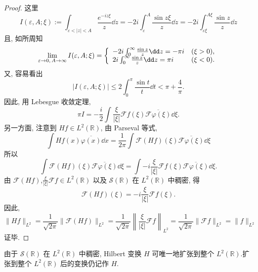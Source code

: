 \begin{proof}
这里
\begin{equation*}
I(\varepsilon, A; \xi) := \int_{\varepsilon < |z| < A}\frac{e^{-iz\xi}}{z}\dd z = -2i\int_{\varepsilon}^{A}\frac{\sin z\xi}{z}\dd z = -2i\int_{\varepsilon\xi}^{A\xi}\frac{\sin z}{z}\dd z
\end{equation*}
且, 如所周知
\begin{equation*}
\lim_{\varepsilon \to 0,\, A \to \infty} I(\varepsilon, A; \xi) = \left\{ \begin{array}{l l}
-2i\int_{0}^{\infty}\frac{\sin z}{z}\dd z = -\pi i & (\xi > 0),\\
2i\int_{0}^{\infty}\frac{\sin z}{z}\dd z = \pi i & (\xi < 0).
\end{array} \right.
\end{equation*}
又, 容易看出
\begin{equation*}
|I(\varepsilon, A; \xi)| \leq 2\int_{0}^{\pi}\frac{\sin t}{t}\dd t < \pi + \frac{4}{\pi}.
\end{equation*}
因此, 用 Lebesgue 收敛定理, 
\begin{equation*}
\pi I = -\frac{i}{2}\int\frac{\xi}{|\xi|}\mathcal{F}f(\xi)\overline{\mathcal{F}\varphi(\xi)}\dd \xi.
\end{equation*}
另一方面, 注意到 $Hf \in L^{2}(\mathbb{R})$, 由 Parseval 等式, 
\begin{equation*}
\int Hf(x)\overline{\varphi(x)}\dd x = \frac{1}{2\pi}\int\mathcal{F}(Hf)(\xi)\overline{\mathcal{F}\varphi(\xi)}\dd \xi
\end{equation*}
所以
\begin{equation*}
\int\mathcal{F}(Hf)(\xi)\overline{\mathcal{F}\varphi(\xi)}\dd \xi = \int -i\frac{\xi}{|\xi|}\mathcal{F}f(\xi)\overline{\mathcal{F}\varphi(\xi)}\dd \xi.
\end{equation*}
由 $\mathcal{F}(Hf)$,$\frac{\xi}{|\xi|}\mathcal{F}f \in L^{2}(\mathbb{R})$ 以及 $\mathcal{S}(\mathbb{R})$ 在 $L^{2}(\mathbb{R})$ 中稠密, 得
\begin{equation*}
\mathcal{F}(Hf)(\xi) = -i\frac{\xi}{|\xi|}\mathcal{F}f(\xi).
\end{equation*}
因此, 
\begin{equation*}
\| Hf \|_{L^{2}} = \frac{1}{\sqrt{2\pi}}\|\mathcal{F}(Hf)\|_{L^{2}} = \frac{1}{\sqrt{2\pi}}\left\|\frac{\xi}{|\xi|}\mathcal{F}f\right\|_{L^{2}} = \frac{1}{\sqrt{2\pi}}\|\mathcal{F}f\|_{L^{2}} = \| f \|_{L^{2}}
\end{equation*}
证毕.
\end{proof}

\begin{definition}\label{def:1.3.4}
由于 $\mathcal{S}(\mathbb{R})$ 在 $L^{2}(\mathbb{R})$ 中稠密, Hilbert 变换 $H$ 可唯一地扩张到整个 $L^{2}(\mathbb{R})$.扩张到整个 $L^{2}(\mathbb{R})$ 后的变换仍记作 $H$.
\end{definition}

